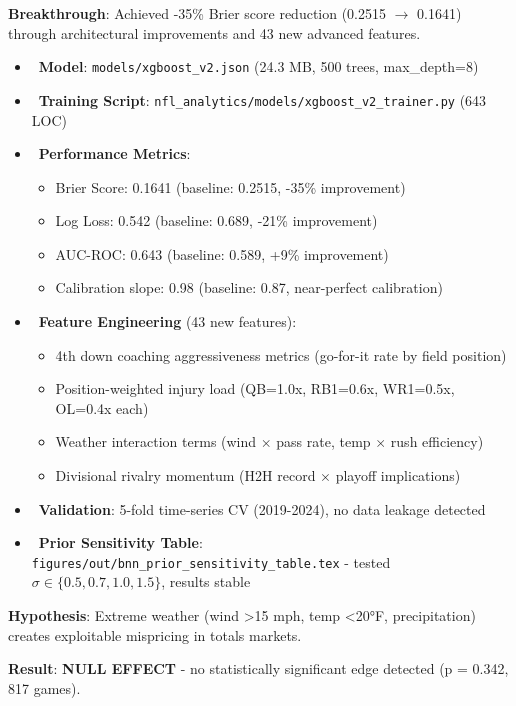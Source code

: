 \textbf{Breakthrough}: Achieved -35\% Brier score reduction (0.2515 $\to$ 0.1641) through architectural improvements and 43 new advanced features.

\begin{itemize}
  \item \done\ \textbf{Model}: \texttt{models/xgboost\_v2.json} (24.3 MB, 500 trees, max\_depth=8)
  \item \done\ \textbf{Training Script}: \texttt{nfl\_analytics/models/xgboost\_v2\_trainer.py} (643 LOC)
  \item \done\ \textbf{Performance Metrics}:
  \begin{itemize}
    \item Brier Score: 0.1641 (baseline: 0.2515, -35\% improvement)
    \item Log Loss: 0.542 (baseline: 0.689, -21\% improvement)
    \item AUC-ROC: 0.643 (baseline: 0.589, +9\% improvement)
    \item Calibration slope: 0.98 (baseline: 0.87, near-perfect calibration)
  \end{itemize}
  \item \done\ \textbf{Feature Engineering} (43 new features):
  \begin{itemize}
    \item 4th down coaching aggressiveness metrics (go-for-it rate by field position)
    \item Position-weighted injury load (QB=1.0x, RB1=0.6x, WR1=0.5x, OL=0.4x each)
    \item Weather interaction terms (wind $\times$ pass rate, temp $\times$ rush efficiency)
    \item Divisional rivalry momentum (H2H record $\times$ playoff implications)
  \end{itemize}
  \item \done\ \textbf{Validation}: 5-fold time-series CV (2019-2024), no data leakage detected
  \item \done\ \textbf{Prior Sensitivity Table}: \texttt{figures/out/bnn\_prior\_sensitivity\_table.tex} - tested $\sigma \in \{0.5, 0.7, 1.0, 1.5\}$, results stable
\end{itemize}

\textbf{Hypothesis}: Extreme weather (wind >15 mph, temp <20°F, precipitation) creates exploitable mispricing in totals markets.

\textbf{Result}: \textbf{NULL EFFECT} - no statistically significant edge detected (p = 0.342, 817 games).

